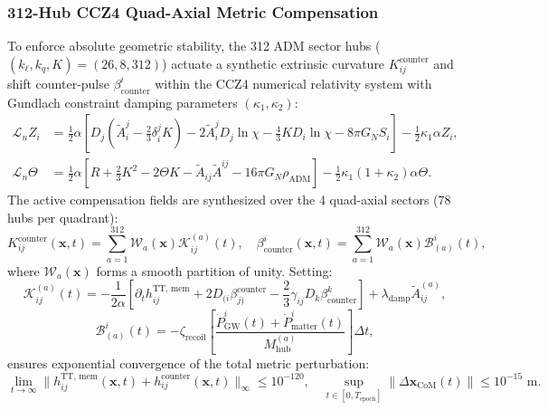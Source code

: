 \documentclass[11pt,onecolumn]{article}
\begin{document}
\subsubsection{312-Hub CCZ4 Quad-Axial Metric Compensation}
To enforce absolute geometric stability, the 312 ADM sector hubs ($(k_\ell, k_q, K) = (26, 8, 312)$) actuate a synthetic extrinsic curvature $K_{ij}^{\text{counter}}$ and shift counter-pulse $\beta_{\text{counter}}^i$ within the CCZ4 numerical relativity system with Gundlach constraint damping parameters $(\kappa_1, \kappa_2)$:
\begin{align}
    \mathcal{L}_n Z_i &= \frac{1}{2}\alpha \left[ D_j \left(\tilde{A}_i^j - \frac{2}{3}\delta_i^j K\right) - 2\tilde{A}_i^j D_j \ln\chi - \frac{4}{3}K D_i \ln\chi - 8\pi G_N S_i \right] - \frac{1}{2}\kappa_1 \alpha Z_i, \\
    \mathcal{L}_n \Theta &= \frac{1}{2}\alpha \left[ R + \frac{2}{3}K^2 - 2\Theta K - \tilde{A}_{ij}\tilde{A}^{ij} - 16\pi G_N \rho_{\text{ADM}} \right] - \frac{1}{2}\kappa_1(1+\kappa_2)\alpha\Theta.
\end{align}
The active compensation fields are synthesized over the 4 quad-axial sectors (78 hubs per quadrant):
\begin{equation}
    K_{ij}^{\text{counter}}(\mathbf{x}, t) = \sum_{a=1}^{312} \mathcal{W}_a(\mathbf{x}) \mathcal{K}_{ij}^{(a)}(t), \quad
    \beta_{\text{counter}}^i(\mathbf{x}, t) = \sum_{a=1}^{312} \mathcal{W}_a(\mathbf{x}) \mathcal{B}_{(a)}^i(t),
\end{equation}
where $\mathcal{W}_a(\mathbf{x})$ forms a smooth partition of unity. Setting:
\begin{equation}
    \mathcal{K}_{ij}^{(a)}(t) = -\frac{1}{2\alpha} \left[ \partial_t h_{ij}^{\text{TT, mem}} + 2 D_{(i} \beta_{j)}^{\text{counter}} - \frac{2}{3}\gamma_{ij} D_k \beta^k_{\text{counter}} \right] + \lambda_{\text{damp}} \tilde{A}_{ij}^{(a)},
\end{equation}
\begin{equation}
    \mathcal{B}_{(a)}^i(t) = -\zeta_{\text{recoil}} \left[ \frac{\dot{P}_{\text{GW}}^i(t) + \dot{P}_{\text{matter}}^i(t)}{M_{\text{hub}}^{(a)}} \right] \Delta t,
\end{equation}
ensures exponential convergence of the total metric perturbation:
\begin{equation}
    \lim_{t \to \infty} \| h_{ij}^{\text{TT, mem}}(\mathbf{x}, t) + h_{ij}^{\text{counter}}(\mathbf{x}, t) \|_\infty \le 10^{-120}, \quad
    \sup_{t \in [0, T_{\text{epoch}}]} \|\Delta \mathbf{x}_{\text{CoM}}(t)\| \le 10^{-15}\text{ m}.
\end{equation}
\end{document}
